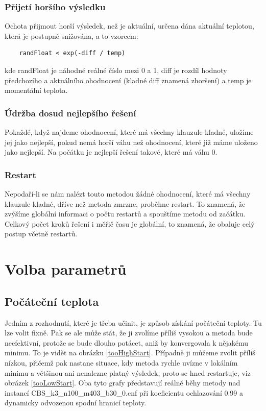 \documentclass[12pt,a4paper]{article}
\begin{document}
\subsubsection{Přijetí horšího výsledku}

Ochota přijmout horší výsledek, než je aktuální, určena dána aktuální teplotou, která je postupně snižována, a to vzorcem:

\begin{verbatim}
    randFloat < exp(-diff / temp)
\end{verbatim}

kde randFloat je náhodné reálné číslo mezi 0 a 1, diff je rozdíl hodnoty předchozího a aktuálního ohodnocení (kladné diff znamená zhoršení) a temp je momentální teplota.


\subsubsection{Údržba dosud nejlepšího řešení}

Pokaždé, když najdeme ohodnocení, které má všechny klauzule kladné, uložíme jej jako nejlepší, pokud nemá horší váhu než ohodnocení, které již máme uloženo jako nejlepší. Na počátku je nejlepší řešení takové, které má váhu 0.



\subsubsection{Restart}

Nepodaří-li se nám nalézt touto metodou žádné ohodnocení, které má všechny klauzule kladné, dříve než metoda zmrzne, proběhne restart. To znamená, že zvýšíme globální informaci o počtu restartů a spouštíme metodu od začátku. Celkový počet kroků řešení i měřič času je globální, to znamená, že obaluje celý postup včetně restartů. 






\section{Volba parametrů}

\subsection{Počáteční teplota}

Jedním z rozhodnutí, které je třeba učinit, je způsob získání počáteční teploty. Tu lze volit fixně. Pak se ale může stát, že ji zvolíme příliš vysokou a metoda bude neefektivní, protože se bude dlouho potácet, aniž by konvergovala k nějakému minimu. To je vidět na obrázku \ref{tooHighStart}. Případně ji můžeme zvolit příliš nízkou, přičemž pak nastane situace, kdy metoda rychle uvízne v lokálním minimu a většinou ani nenalezne platný výsledek, proto se hned restartuje, viz obrázek \ref{tooLowStart}. Oba tyto grafy představují reálné běhy metody nad instancí CBS\_k3\_n100\_m403\_b30\_0.cnf při koeficientu ochlazování 0.99 a dynamicky odvozenou spodní hranicí teploty.
\end{document}
